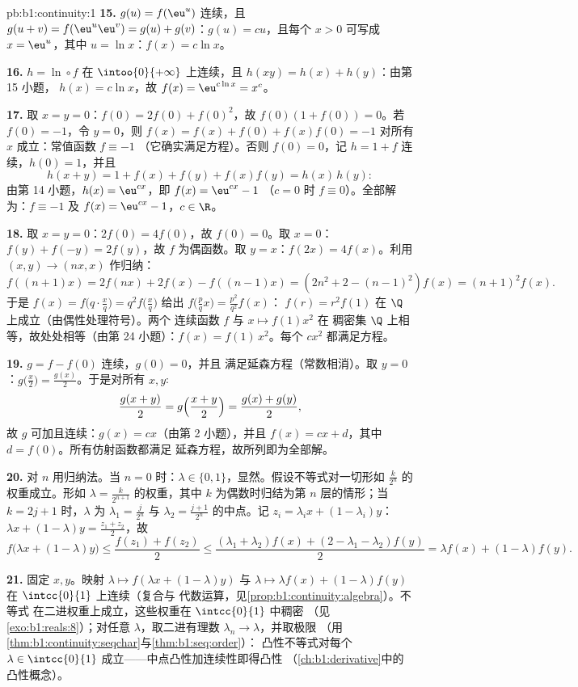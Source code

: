 \begin{solution}{pb:b1:continuity:1}
\textbf{15.} $g(u) = f(\eu^u)$ 连续，且 $g(u + v) =
f(\eu^u \eu^v) = g(u) + g(v)$：$g(u) = cu$，且每个 $x > 0$
可写成 $x = \eu^u$，其中 $u = \ln x$：$f(x) = c\ln x$。

\textbf{16.} $h = \ln \circ f$ 在
$\intoo{0}{+\infty}$ 上连续，且 $h(xy) = h(x) + h(y)$：由第 15 小题，
$h(x) = c\ln x$，故 $f(x) = \eu^{c\ln x} = x^c$。

\textbf{17.} 取 $x = y = 0$：$f(0) = 2f(0) + f(0)^2$，故 $f(0)(1 +
f(0)) = 0$。若 $f(0) = -1$，令 $y = 0$，则 $f(x) = f(x) +
f(0) + f(x)f(0) = -1$ 对所有 $x$ 成立：常值函数 $f \equiv -1$
（它确实满足方程）。否则 $f(0) = 0$，记 $h
= 1 + f$ 连续，$h(0) = 1$，并且
\[
h(x + y) = 1 + f(x) + f(y) + f(x)f(y) = h(x)\,h(y) :
\]
由第 14 小题，$h(x) = \eu^{cx}$，即 $f(x) = \eu^{cx} - 1$
（$c = 0$ 时 $f \equiv 0$）。全部解为：$f
\equiv -1$ 及 $f(x) = \eu^{cx} - 1$，$c \in \R$。

\textbf{18.} 取 $x = y = 0$：$2f(0) = 4f(0)$，故 $f(0) = 0$。取 $x =
0$：$f(y) + f(-y) = 2f(y)$，故 $f$ 为偶函数。取 $y = x$：$f(2x) =
4f(x)$。利用 $(x, y) \to (nx, x)$ 作归纳：
\[
f((n{+}1)x) = 2f(nx) + 2f(x) - f((n{-}1)x)
= (2n^2 + 2 - (n-1)^2) f(x) = (n+1)^2 f(x) .
\]
于是 $f(x) = f\bigl(q\cdot\frac xq\bigr) = q^2 f\bigl(\frac
xq\bigr)$ 给出 $f\bigl(\frac pq x\bigr) = \frac{p^2}{q^2}f(x)$：
$f(r) = r^2 f(1)$ 在 $\Q$ 上成立（由偶性处理符号）。两个
连续函数 $f$ 与 $x \mapsto f(1)x^2$ 在
稠密集 $\Q$ 上相等，故处处相等（由第 24 小题）：$f(x) =
f(1)\,x^2$。每个 $cx^2$ 都满足方程。

\textbf{19.} $g = f - f(0)$ 连续，$g(0) = 0$，并且
满足延森方程（常数相消）。取 $y =
0$：$g\bigl(\frac x2\bigr) = \frac{g(x)}{2}$。于是对所有 $x,
y$:
\[
\frac{g(x + y)}{2} = g\Bigl(\frac{x+y}{2}\Bigr)
= \frac{g(x) + g(y)}{2} ,
\]
故 $g$ 可加且连续：$g(x) = cx$（由第 2 小题），并且
$f(x) = cx + d$，其中 $d = f(0)$。所有仿射函数都满足
延森方程，故所列即为全部解。

\textbf{20.} 对 $n$ 用归纳法。当 $n = 0$ 时：$\lambda \in \{0,
1\}$，显然。假设不等式对一切形如
$\frac{k}{2^n}$ 的权重成立。形如 $\lambda = \frac{k}{2^{n+1}}$ 的权重，其中 $k$
为偶数时归结为第 $n$ 层的情形；当 $k = 2j + 1$ 时，$\lambda$
为 $\lambda_1 = \frac{j}{2^n}$ 与 $\lambda_2 =
\frac{j+1}{2^n}$ 的中点。记 $z_i = \lambda_i x + (1 - \lambda_i)y$：
$\lambda x + (1-\lambda)y = \frac{z_1 + z_2}{2}$，故
\[
f\bigl(\lambda x + (1{-}\lambda)y\bigr)
\leq \frac{f(z_1) + f(z_2)}{2}
\leq \frac{(\lambda_1 + \lambda_2)f(x) + (2 - \lambda_1 -
\lambda_2)f(y)}{2}
= \lambda f(x) + (1 - \lambda)f(y) .
\]

\textbf{21.} 固定 $x, y$。映射 $\lambda \mapsto f(\lambda x +
(1 - \lambda)y)$ 与 $\lambda \mapsto \lambda f(x) + (1 -
\lambda)f(y)$ 在 $\intcc{0}{1}$ 上连续（复合与
代数运算，见\cref{prop:b1:continuity:algebra}）。不等式
在二进权重上成立，这些权重在 $\intcc{0}{1}$ 中稠密
（见\cref{exo:b1:reals:8}）；对任意 $\lambda$，取二进有理数
$\lambda_n \to \lambda$，并取极限
（用\cref{thm:b1:continuity:seqchar}与\cref{thm:b1:seq:order}）：
凸性不等式对每个 $\lambda \in
\intcc{0}{1}$ 成立——中点凸性加连续性即得凸性
（\cref{ch:b1:derivative}中的凸性概念）。


\end{solution}
